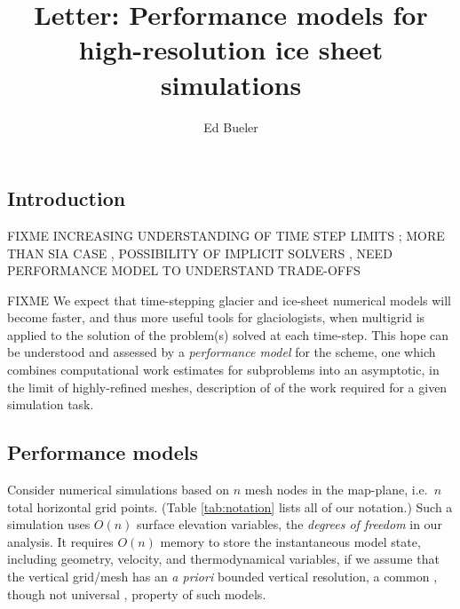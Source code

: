 \documentclass[twocolumn,letterpaper]{igs}
\begin{document}
\title[Performance models for high-resolution ice sheet simulations]{Letter: Performance models for \\ high-resolution ice sheet simulations}


\author{Ed Bueler}



\maketitle

\sectionsize

\subsection{Introduction}

FIXME INCREASING UNDERSTANDING OF TIME STEP LIMITS \citep{Chengetal2017,Robinsonetal2022}; MORE THAN SIA CASE \citep[for comparison]{HindmarshPayne1996}, POSSIBILITY OF IMPLICIT SOLVERS \citep{Bueler2016,WirbelJarosch2020}, NEED PERFORMANCE MODEL TO UNDERSTAND TRADE-OFFS

FIXME We expect that time-stepping glacier and ice-sheet numerical models will become faster, and thus more useful tools for glaciologists, when multigrid is applied to the solution of the problem(s) solved at each time-step.  This hope can be understood and assessed by a \emph{performance model} for the scheme, one which combines computational work estimates for subproblems into an asymptotic, in the limit of highly-refined meshes, description of of the work required for a given simulation task.

\subsection{Performance models}

Consider numerical simulations based on $n$ mesh nodes in the map-plane, i.e.~$n$ total horizontal grid points.  (Table \ref{tab:notation} lists all of our notation.)  Such a simulation uses $O(n)$ surface elevation variables, the \emph{degrees of freedom} in our analysis.  It requires $O(n)$ memory to store the instantaneous model state, including geometry, velocity, and thermodynamical variables, if we assume that the vertical grid/mesh has an \emph{a priori} bounded vertical resolution, a common \citep[for example]{Brinkerhoffetal2017,Hoffmanetal2018}, though not universal \citep{IsaacStadlerGhattas2015}, property of such models.
\end{document}
